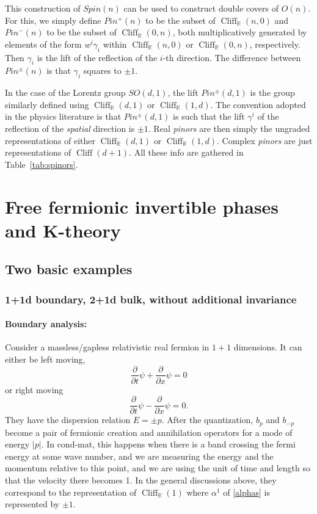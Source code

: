 \documentclass[12pt]{article}
\numberwithin{equation}{section}
\numberwithin{figure}{section}
\theoremstyle{remark}
\def\bR{\mathbb{R}}
\def\Cliff{\mathop{\mathrm{Cliff}}\nolimits}
\begin{document}
This construction of $Spin(n)$ can be used to construct double covers of $O(n)$.
For this, we simply define $Pin^+(n)$ to be the subset of $\Cliff_\bR(n,0)$
and $Pin^-(n)$ to be the subset of $\Cliff_\bR(0,n)$,
both multiplicatively generated by elements of the form $w^i \gamma_i$ 
within $\Cliff_\bR(n,0)$ or $\Cliff_\bR(0,n)$, respectively. 
Then $\gamma_i$  is the lift of the reflection of the $i$-th direction.
The difference between $Pin^\pm(n)$ is that $\gamma_i$ squares to $\pm1$.

In the case of the Lorentz group $SO(d,1)$, the lift $Pin^\pm(d,1)$ is
the group similarly defined using $\Cliff_\bR(d,1)$ or $\Cliff_\bR(1,d)$.
The convention adopted in the physics literature is that
$Pin^\pm(d,1)$ is such that the lift $\gamma^i$ 
of the reflection of the \emph{spatial} direction is $\pm1$.
Real \emph{pinors} are then simply the ungraded representations of either $\Cliff_\bR(d,1)$ or $\Cliff_\bR(1,d)$.
Complex \emph{pinors} are just representations of $\Cliff(d+1)$.
All these info are gathered in Table~\ref{tab:spinors}.

\goodbreak

\section{Free fermionic invertible phases and K-theory}

\subsection{Two basic examples}
\label{sec:basic-free-examples}

\subsubsection{1+1d boundary, 2+1d bulk, without additional invariance}
\paragraph{Boundary analysis:}
Consider a massless/gapless relativistic real fermion in $1+1$ dimensions. 
It can either be left moving, \begin{equation}
\frac{\partial}{\partial t} \psi + \frac{\partial} {\partial x}\psi =0
\end{equation} or right moving \begin{equation}
\frac{\partial}{\partial t} \psi - \frac{\partial} {\partial x}\psi =0.
\end{equation} They have the dispersion relation $E=\pm p$.
After the quantization, $b_p$ and $b_{-p}$ become 
a pair of fermionic creation and annihilation operators for a mode of energy $|p|$.
In cond-mat, this happens when there is a band crossing the fermi energy at some wave number,
and we are measuring the energy and the momentum relative to this point,
and we are using the unit of time and length so that the velocity there becomes 1.
In the general discussions above, they correspond to the representation of $\Cliff_\bR(1)$
where $\alpha^1$ of \eqref{alphas} is represented by $\pm1$.
\end{document}
